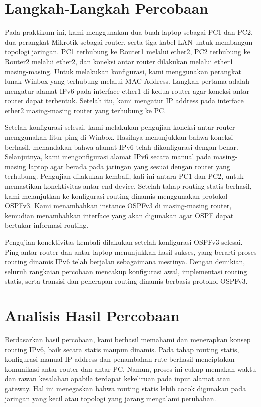 \section{Langkah-Langkah Percobaan}

Pada praktikum ini, kami menggunakan dua buah laptop sebagai PC1 dan PC2, dua perangkat Mikrotik sebagai router, serta tiga kabel LAN untuk membangun topologi jaringan. PC1 terhubung ke Router1 melalui ether2, PC2 terhubung ke Router2 melalui ether2, dan koneksi antar router dilakukan melalui ether1 masing-masing. Untuk melakukan konfigurasi, kami menggunakan perangkat lunak Winbox yang terhubung melalui MAC Address. Langkah pertama adalah mengatur alamat IPv6 pada interface ether1 di kedua router agar koneksi antar-router dapat terbentuk. Setelah itu, kami mengatur IP address pada interface ether2 masing-masing router yang terhubung ke PC.

Setelah konfigurasi selesai, kami melakukan pengujian koneksi antar-router menggunakan fitur ping di Winbox. Hasilnya menunjukkan bahwa koneksi berhasil, menandakan bahwa alamat IPv6 telah dikonfigurasi dengan benar. Selanjutnya, kami mengonfigurasi alamat IPv6 secara manual pada masing-masing laptop agar berada pada jaringan yang sesuai dengan router yang terhubung. Pengujian dilakukan kembali, kali ini antara PC1 dan PC2, untuk memastikan konektivitas antar end-device. Setelah tahap routing statis berhasil, kami melanjutkan ke konfigurasi routing dinamis menggunakan protokol OSPFv3. Kami menambahkan instance OSPFv3 di masing-masing router, kemudian menambahkan interface yang akan digunakan agar OSPF dapat bertukar informasi routing.

Pengujian konektivitas kembali dilakukan setelah konfigurasi OSPFv3 selesai. Ping antar-router dan antar-laptop menunjukkan hasil sukses, yang berarti proses routing dinamis IPv6 telah berjalan sebagaimana mestinya. Dengan demikian, seluruh rangkaian percobaan mencakup konfigurasi awal, implementasi routing statis, serta transisi dan penerapan routing dinamis berbasis protokol OSPFv3.

\section{Analisis Hasil Percobaan}

Berdasarkan hasil percobaan, kami berhasil memahami dan menerapkan konsep routing IPv6, baik secara statis maupun dinamis. Pada tahap routing statis, konfigurasi manual IP address dan penambahan rute berhasil menciptakan komunikasi antar-router dan antar-PC. Namun, proses ini cukup memakan waktu dan rawan kesalahan apabila terdapat kekeliruan pada input alamat atau gateway. Hal ini menegaskan bahwa routing statis lebih cocok digunakan pada jaringan yang kecil atau topologi yang jarang mengalami perubahan.

